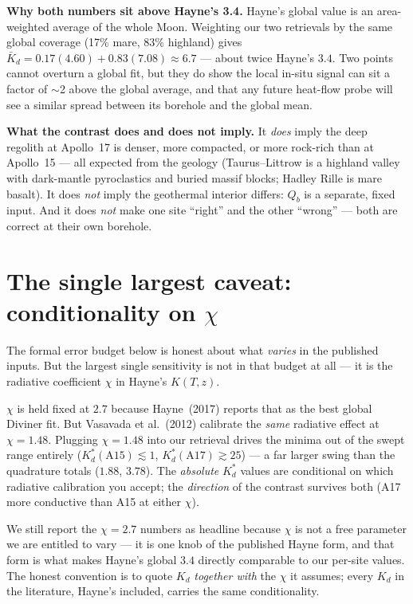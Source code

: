 \documentclass[11pt]{report}
\begin{document}
\noindent\textbf{Why both numbers sit above Hayne's 3.4.} Hayne's global value is
an area-weighted average of the whole Moon. Weighting our two retrievals by the
same global coverage (17\% mare, 83\% highland) gives
$\bar K_d=0.17(4.60)+0.83(7.08)\approx6.7$ --- about twice Hayne's $3.4$. Two
points cannot overturn a global fit, but they do show the local in-situ signal
can sit a factor of $\sim$2 above the global average, and that any future
heat-flow probe will see a similar spread between its borehole and the global
mean.

\noindent\textbf{What the contrast does and does not imply.} It \emph{does} imply
the deep regolith at Apollo~17 is denser, more compacted, or more rock-rich than
at Apollo~15 --- all expected from the geology (Taurus--Littrow is a highland
valley with dark-mantle pyroclastics and buried massif blocks; Hadley Rille is
mare basalt). It does \emph{not} imply the geothermal interior differs: $Q_b$ is
a separate, fixed input. And it does \emph{not} make one site ``right'' and the
other ``wrong'' --- both are correct at their own borehole.

\section{The single largest caveat: conditionality on $\chi$}\label{sec:chi}

The formal error budget below is honest about what \emph{varies} in the published
inputs. But the largest single sensitivity is not in that budget at all --- it is
the radiative coefficient $\chi$ in Hayne's $K(T,z)$.

\begin{warn}
$\chi$ is held fixed at $2.7$ because Hayne~(2017) reports that as the best global
Diviner fit. But Vasavada et al.~(2012) calibrate the \emph{same} radiative effect
at $\chi=1.48$. Plugging $\chi=1.48$ into our retrieval drives the minima out of the swept
range entirely ($K_d^{*}(\mathrm{A15})\!\lesssim\!1$,
$K_d^{*}(\mathrm{A17})\!\gtrsim\!25$) ---
a far larger swing than the quadrature totals ($1.88$, $3.78$). The
\emph{absolute} $K_d^{*}$ values are conditional on which radiative calibration
you accept; the \emph{direction} of the contrast survives both (A17 more
conductive than A15 at either $\chi$).
\end{warn}

\noindent We still report the $\chi=2.7$ numbers as headline because $\chi$ is
not a free parameter we are entitled to vary --- it is one knob of the published
Hayne form, and that form is what makes Hayne's global $3.4$ directly comparable
to our per-site values. The honest convention is to quote $K_d$ \emph{together
with} the $\chi$ it assumes; every $K_d$ in the literature, Hayne's included,
carries the same conditionality.
\end{document}

